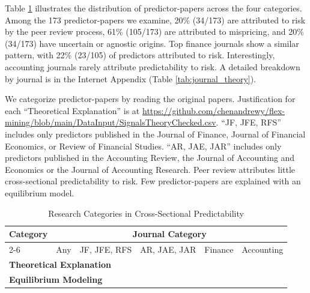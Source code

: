 Table \ref{tab:hetero-count} illustrates the distribution of predictor-papers across the four categories. Among the 173 predictor-papers we examine, 20\% (34/173) are attributed to risk by the peer review process, 61\% (105/173) are attributed to mispricing, and 20\% (34/173) have uncertain or agnostic origins. Top finance journals show a similar pattern, with 22\% (23/105) of predictors attributed to risk. Interestingly, accounting journals rarely attribute predictability to risk. A detailed breakdown by journal is in the Internet Appendix (Table \ref{tab:journal_theory}).

\begin{table}[!h]\caption{Research Categories in Cross-Sectional Predictability}
\label{tab:hetero-count}

\begin{singlespace}
\noindent  We categorize predictor-papers by reading the original papers. Justification for each ``Theoretical Explanation'' is at \url{https://github.com/chenandrewy/flex-mining/blob/main/DataInput/SignalsTheoryChecked.csv}. ``JF, JFE, RFS'' includes only predictors published in the Journal of Finance, Journal of Financial Economics, or Review of Financial Studies. ``AR, JAE, JAR'' includes only predictors published in the Accounting Review, the Journal of Accounting and Economics or the Journal of Accounting Research. Peer review attributes little cross-sectional predictability to risk. Few predictor-papers are explained with an equilibrium model.
\end{singlespace}
\begin{centering}
\vspace{-1ex}
\par\end{centering}
\centering{}\setlength{\tabcolsep}{1ex} \footnotesize
\begin{center}
   \begin{tabular}{lrrrrr}
      \toprule
      \multicolumn{1}{l}{\textbf{Category}} 
        & \multicolumn{5}{c}{\textbf{Journal Category}} \\
      \cmidrule(lr){2-6}
      & Any & JF, JFE, RFS & AR, JAE, JAR & Finance & Accounting \\
      \midrule
      \multicolumn{6}{l}{\textbf{Theoretical Explanation}} \\
      
      \multicolumn{6}{l}{\textbf{Equilibrium Modeling}} \\
      
      \midrule
      
      \bottomrule
   \end{tabular}
\end{center} 
\end{table}

